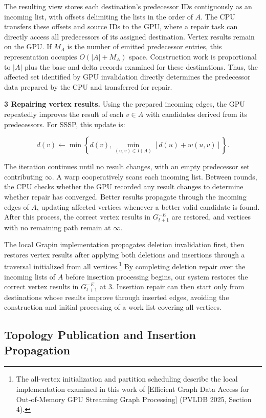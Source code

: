 The resulting view stores each destination's predecessor IDs contiguously as an incoming list, with offsets delimiting the lists in the order of $A$. The CPU transfers these offsets and source IDs to the GPU, where a repair task can directly access all predecessors of its assigned destination. Vertex results remain on the GPU. If $M_A$ is the number of emitted predecessor entries, this representation occupies $O(|A|+M_A)$ space. Construction work is proportional to $|A|$ plus the base and delta records examined for these destinations. Thus, the affected set identified by GPU invalidation directly determines the predecessor data prepared by the CPU and transferred for repair.

\textbf{3 Repairing vertex results.} Using the prepared incoming edges, the GPU repeatedly improves the result of each $v\in A$ with candidates derived from its predecessors. For SSSP, this update is:

\[
d(v)\leftarrow\min\left\{d(v),
\min_{(u,v)\in I(A)}[d(u)+w(u,v)]\right\}.
\tag{5.2}
\]

The iteration continues until no result changes, with an empty predecessor set contributing $\infty$. A warp cooperatively scans each incoming list. Between rounds, the CPU checks whether the GPU recorded any result changes to determine whether repair has converged. Better results propagate through the incoming edges of $A$, updating affected vertices whenever a better valid candidate is found. After this process, the correct vertex results in $G_{t+1}^{-E}$ are restored, and vertices with no remaining path remain at $\infty$.

The local Grapin implementation propagates deletion invalidation first, then restores vertex results after applying both deletions and insertions through a traversal initialized from all vertices.\footnote{The all-vertex initialization and partition scheduling describe the local implementation examined in this work of [Efficient Graph Data Access for Out-of-Memory GPU Streaming Graph Processing] (PVLDB 2025, Section 4).} By completing deletion repair over the incoming lists of $A$ before insertion processing begins, our system restores the correct vertex results in $G_{t+1}^{-E}$ at 3. Insertion repair can then start only from destinations whose results improve through inserted edges, avoiding the construction and initial processing of a work list covering all vertices.

\subsection{Topology Publication and Insertion Propagation}

